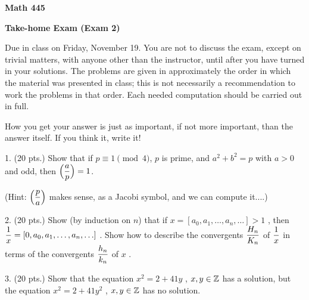
\nopagenumbers


\def\nidt{\noindent}
\def\itt{item}
\def\ctln{\centerline}
\def\u{\underbar}
\def\ssk{\smallskip}
\def\msk{\medskip}
\def\bsk{\bigskip}
\def\hsk{\hskip.1in}
\def\hhsk{\hskip.2in}
\def\dsl{\displaystyle}


\loadmsbm


\ctln{\bf Math 445}

\msk

\ctln{\bf Take-home Exam (Exam 2)}

\msk

{\narrower Due in class on Friday, November 19. You are not to discuss
the exam, except on trivial matters, with anyone other than the instructor, 
until after you have turned in your solutions. The problems are given in 
approximately the order in which the material was presented
in class; this is not necessarily a recommendation to work the problems 
in that order. Each needed computation should be carried out in full.\par}

\msk

How you get your answer is just 
as important, if not more important, than the 
answer itself. If you think it, write it!

\bsk


\item{1.} (20 pts.) Show that if $p\equiv 1\pmod{4}$, $p$ is prime, and $a^2+b^2=p$ with
$a>0$ and odd, then $\dsl \Big({{a}\over{p}}\Big) = 1$.

\ssk

\item{} (Hint: $\dsl \Big({{p}\over{a}}\Big)$ makes sense, as a Jacobi symbol, and we can compute it....)



\bsk

\item{2.} (20 pts.) Show (by induction on $n$) that if $x = [a_0,a_1,\ldots ,a_n,\ldots ] >1$ , then 
$\dsl {{1}\over{x}} = [0,a_0,a_1,\ldots ,a_n,\ldots]$ . Show how to describe the convergents 
$\dsl {{H_n}\over{K_n}}$ of 
$\dsl {{1}\over{x}}$ in terms of the convergents $\dsl {{h_n}\over{k_n}}$ of $x$ .



\bsk

\item{3.} (20 pts.)  Show that the equation $x^2=2+41y$ , $x,y\in{\Bbb Z}$ has a solution, but the
equation $x^2=2+41y^2$ , $x,y\in{\Bbb Z}$ has no solution.



